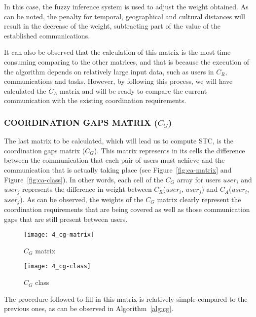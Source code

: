 In this case, the fuzzy inference system is used to adjust the weight obtained. As can be noted, the penalty for temporal, geographical and cultural distances will result in the decrease of the weight, subtracting part of the value of the established communications.

It can also be observed that the calculation of this matrix is the most time-consuming comparing to the other matrices, and that is because the execution of the algorithm depends on relatively large input data, such as users in $C_R$, communications and tasks. However, by following this process, we will have calculated the $C_A$ matrix and will be ready to compare the current communication with the existing coordination requirements.

\subsubsection{COORDINATION GAPS MATRIX ($C_G$)}

The last matrix to be calculated, which will lead us to compute STC, is the coordination gaps matrix ($C_G$). This matrix represents in its cells the difference between the communication that each pair of users must achieve and the communication that is actually taking place (see Figure~\ref{fig:ca-matrix} and Figure~\ref{fig:ca-class}). In other words, each cell of the $C_G$ array for users $user_i$ and $user_j$ represents the difference in weight between $C_R$($user_i$, $user_j$) and $C_A$($user_i$, $user_j$). As can be observed, the weights of the $C_G$ matrix clearly represent the coordination requirements that are being covered as well as those communication gaps that are still present between users.

\begin{figure}
	\centering
	\texttt{[image: 4\_cg-matrix]}
	\caption[$C_G$ matrix]{$C_G$ matrix}
	\label{fig:cg-matrix}
\end{figure}

\begin{figure}
	\centering
	\texttt{[image: 4\_cg-class]}
	\caption[$C_G$ class]{$C_G$ class}
	\label{fig:cg-class}
\end{figure}

The procedure followed to fill in this matrix is relatively simple compared to the previous ones, as can be observed in Algorithm~\ref{alg:cg}.

